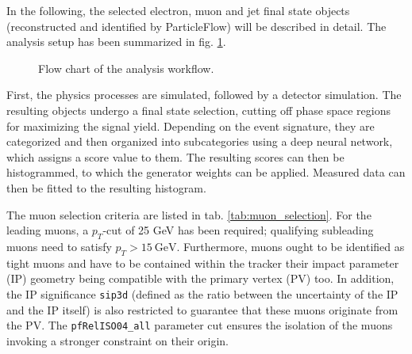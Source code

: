 
In the following, the selected electron, muon and jet final state objects (reconstructed and identified by ParticleFlow) will be described in detail. The analysis setup has been summarized in fig. \ref{fig:analysis_workflow}.

\begin{figure}[h!]
	\centering
	\caption{Flow chart of the analysis workflow.}
	\label{fig:analysis_workflow}
\end{figure}

First, the physics processes are simulated, followed by a detector simulation. The resulting objects undergo a final state selection, cutting off phase space regions for maximizing the signal yield. Depending on the event signature, they are categorized and then organized into subcategories using a deep neural network, which assigns a score value to them. The resulting scores can then be histogrammed, to which the generator weights can be applied. Measured data can then be fitted to the resulting histogram.

The muon selection criteria are listed in tab. \ref{tab:muon_selection}. For the leading muons, a $p_T$-cut of 25 GeV has been required; qualifying subleading muons need to satisfy $p_T>\SI{15}{\giga\electronvolt}$. Furthermore, muons ought to be identified as tight muons and have to be contained within the tracker their impact parameter (IP) geometry being compatible with the primary vertex (PV) too. In addition, the IP significance \texttt{sip3d} (defined as the ratio between the uncertainty of the IP and the IP itself) is also restricted to guarantee that these muons originate from the PV. The \texttt{pfRelISO04\_all} parameter cut ensures the isolation of the muons invoking a stronger constraint on their origin.

